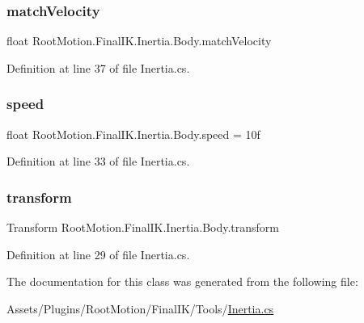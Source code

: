 \subsubsection{\texorpdfstring{match\+Velocity}{matchVelocity}}
{\footnotesize\ttfamily float Root\+Motion.\+Final\+I\+K.\+Inertia.\+Body.\+match\+Velocity}



Definition at line 37 of file Inertia.\+cs.

\mbox{\label{class_root_motion_1_1_final_i_k_1_1_inertia_1_1_body_a6c85a65f736e7006a4be07b29315022b}} 
\subsubsection{\texorpdfstring{speed}{speed}}
{\footnotesize\ttfamily float Root\+Motion.\+Final\+I\+K.\+Inertia.\+Body.\+speed = 10f}



Definition at line 33 of file Inertia.\+cs.

\mbox{\label{class_root_motion_1_1_final_i_k_1_1_inertia_1_1_body_a091d2f617b503e98752f8da42b4331b1}} 
\subsubsection{\texorpdfstring{transform}{transform}}
{\footnotesize\ttfamily Transform Root\+Motion.\+Final\+I\+K.\+Inertia.\+Body.\+transform}



Definition at line 29 of file Inertia.\+cs.



The documentation for this class was generated from the following file\+:\begin{DoxyCompactItemize}
\item 
Assets/\+Plugins/\+Root\+Motion/\+Final\+I\+K/\+Tools/\mbox{\hyperlink{_inertia_8cs}{Inertia.\+cs}}\end{DoxyCompactItemize}
